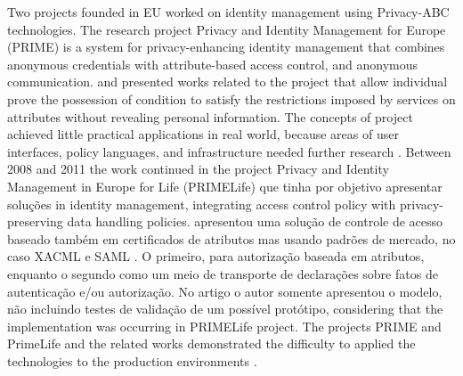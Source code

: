 \documentclass{doublecol-new}
\begin{document}
Two projects founded in EU worked on identity management using Privacy-ABC technologies. The research project Privacy and Identity Management for Europe (PRIME) is a system for privacy-enhancing identity management that combines anonymous credentials with attribute-based access control, and anonymous communication. \cite{ardagna2008privacy} and \cite{ardagna2010exploiting} presented works related to the project that allow individual prove the possession of condition to satisfy the restrictions imposed by services on attributes without revealing personal information. The concepts of project achieved little practical applications in real world, because areas of user interfaces, policy languages, and infrastructure needed further research \citep{ardagna2010enabling,bichsel2013h2}. Between 2008 and 2011 the work continued in the project Privacy and Identity Management in Europe for Life (PRIMELife) que tinha por objetivo apresentar soluções in identity management, integrating access control policy with privacy-preserving data handling policies. \cite{ardagna2010enabling} apresentou uma solução de controle de acesso baseado também em certificados de atributos mas usando padrões de mercado, no caso XACML \citep{rissanen2013extensible} e SAML \citep{ragouzis2008security}. O primeiro, para autorização baseada em atributos, enquanto o segundo como um meio de transporte de declarações sobre fatos de autenticação e/ou autorização. No artigo o autor somente apresentou o modelo, não incluindo testes de validação de um possível protótipo, considering that the implementation was occurring in PRIMELife project. The projects PRIME and PrimeLife and the related works demonstrated the difficulty to applied the technologies to the production environments \cite{bichsel2013h2}.
\end{document}
